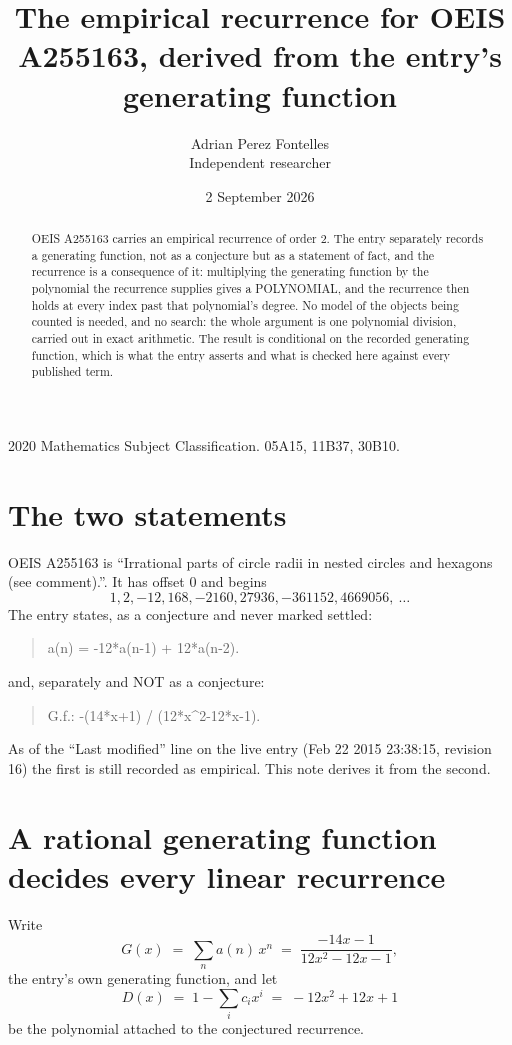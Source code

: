 \documentclass[11pt,a4paper]{article}
\title{The empirical recurrence for OEIS A255163, derived from the entry's generating function}
\author{Adrian Perez Fontelles\\ \small Independent researcher}
\date{2 September 2026}
\theoremstyle{plain}
\theoremstyle{definition}
\begin{document}
\maketitle

\begin{abstract}
OEIS A255163 carries an empirical recurrence of order $2$. The entry separately records a
generating function, not as a conjecture but as a statement of fact, and the recurrence is a
consequence of it: multiplying the generating function by the polynomial the recurrence
supplies gives a POLYNOMIAL, and the recurrence then holds at every index past that
polynomial's degree. No model of the objects being counted is needed, and no search: the
whole argument is one polynomial division, carried out in exact arithmetic. The result is
conditional on the recorded generating function, which is what the entry asserts and what is
checked here against every published term.
\end{abstract}

\noindent\small 2020 Mathematics Subject Classification. 05A15, 11B37, 30B10.\normalsize

\section{The two statements}

OEIS A255163 is ``Irrational parts of circle radii in nested circles and hexagons (see comment).''. It has offset $0$ and begins
\[
1, 2, -12, 168, -2160, 27936, -361152, 4669056,\ \dots
\]
The entry states, as a conjecture and never marked settled:
\begin{quote}
a(n) = -12*a(n-1) + 12*a(n-2).
\end{quote}
and, separately and NOT as a conjecture:
\begin{quote}
G.f.: -(14*x+1) / (12*x\^{}2-12*x-1).
\end{quote}
As of the ``Last modified'' line on the live entry (Feb 22 2015 23:38:15, revision 16) the first is still
recorded as empirical. This note derives it from the second.

\section{A rational generating function decides every linear recurrence}

Write
\[
G(x)\;=\;\sum_{n}a(n)\,x^{n}\;=\;\frac{- 14 x - 1}{12 x^{2} - 12 x - 1},
\]
the entry's own generating function, and let
\[
D(x)\;=\;1-\sum_i c_i x^{i}\;=\;- 12 x^{2} + 12 x + 1
\]
be the polynomial attached to the conjectured recurrence.
\end{document}
